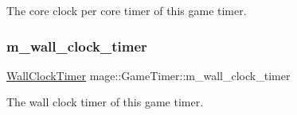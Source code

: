 The core clock per core timer of this game timer. \hypertarget{classmage_1_1_game_timer_ae3746f7a55d6b150f2d1fead4a1f227c}{}\label{classmage_1_1_game_timer_ae3746f7a55d6b150f2d1fead4a1f227c} 
\subsubsection{\texorpdfstring{m\+\_\+wall\+\_\+clock\+\_\+timer}{m\_wall\_clock\_timer}}
{\footnotesize\ttfamily \hyperlink{namespacemage_a06f4035ef59f07892e594bf1178a108a}{Wall\+Clock\+Timer} mage\+::\+Game\+Timer\+::m\+\_\+wall\+\_\+clock\+\_\+timer\hspace{0.3cm}{\ttfamily [private]}}

The wall clock timer of this game timer. 